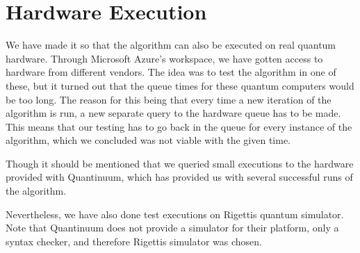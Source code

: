 \section{Hardware Execution}\label{sec:hardware-execution}
We have made it so that the algorithm can also be executed on real quantum hardware.
Through Microsoft Azure's workspace, we have gotten access to hardware from different vendors.
The idea was to test the algorithm in one of these, but it turned out that the queue times for these quantum computers would be too long.
The reason for this being that every time a new iteration of the algorithm is run, a new separate query to the hardware queue has to be made.
This means that our testing has to go back in the queue for every instance of the algorithm, which we concluded was not viable with the given time.

Though it should be mentioned that we queried small executions to the hardware provided with Quantinuum, which has provided us with several successful runs of the algorithm.

Nevertheless, we have also done test executions on Rigettis quantum simulator.
Note that Quantinuum does not provide a simulator for their platform, only a syntax checker, and therefore Rigettis simulator was chosen.
